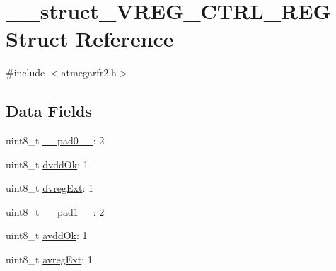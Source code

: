 \hypertarget{struct____struct___v_r_e_g___c_t_r_l___r_e_g}{\section{\-\_\-\-\_\-struct\-\_\-\-V\-R\-E\-G\-\_\-\-C\-T\-R\-L\-\_\-\-R\-E\-G Struct Reference}
\label{struct____struct___v_r_e_g___c_t_r_l___r_e_g}
}


{\ttfamily \#include $<$atmegarfr2.\-h$>$}

\subsection*{Data Fields}
\begin{DoxyCompactItemize}
\item 
uint8\-\_\-t \hyperlink{struct____struct___v_r_e_g___c_t_r_l___r_e_g_a9fa4c4efb1e37b55709c564fc3427f23}{\-\_\-\-\_\-pad0\-\_\-\-\_\-}\-: 2
\item 
uint8\-\_\-t \hyperlink{struct____struct___v_r_e_g___c_t_r_l___r_e_g_ab7f6d0f0c4b774b0583f77ada8c6c8bc}{dvdd\-Ok}\-: 1
\item 
uint8\-\_\-t \hyperlink{struct____struct___v_r_e_g___c_t_r_l___r_e_g_a79d216f2b2cc15d4a1faef159df0c0c2}{dvreg\-Ext}\-: 1
\item 
uint8\-\_\-t \hyperlink{struct____struct___v_r_e_g___c_t_r_l___r_e_g_ad41a6206a3a91dc80ac4cdc67f67578f}{\-\_\-\-\_\-pad1\-\_\-\-\_\-}\-: 2
\item 
uint8\-\_\-t \hyperlink{struct____struct___v_r_e_g___c_t_r_l___r_e_g_aaf1500fe12c9b9a12111abb394f07a49}{avdd\-Ok}\-: 1
\item 
uint8\-\_\-t \hyperlink{struct____struct___v_r_e_g___c_t_r_l___r_e_g_aab7f9fff7bae6cbb1174fdf2a1ac58a6}{avreg\-Ext}\-: 1
\end{DoxyCompactItemize}


